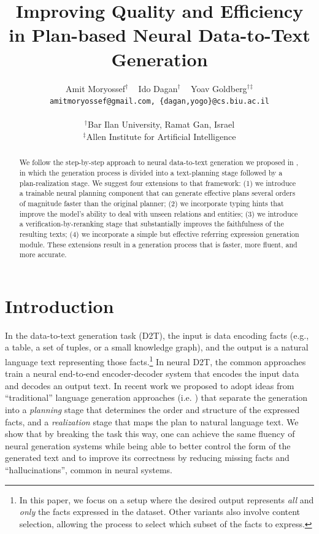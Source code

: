 \documentclass[11pt,a4paper,table,xcdraw]{article}
\title{Improving Quality and Efficiency \\in Plan-based Neural Data-to-Text Generation}
\author{Amit Moryossef$^\dagger \;\;\;$  Ido Dagan$^\dagger \;\;\;$ Yoav Goldberg$^\dagger$$^\ddagger$ \\
\texttt{amitmoryossef@gmail.com, \{dagan,yogo\}@cs.biu.ac.il} \\
\\ $^\dagger$Bar Ilan University, Ramat Gan, Israel \\
$^\ddagger$Allen Institute for Artificial Intelligence}
\date{}
\begin{document}
\maketitle
\begin{abstract}
We follow the step-by-step approach to neural data-to-text generation we proposed in \citet{step-by-step}, in which the generation process is divided into a text-planning stage followed by a plan-realization stage.
We suggest four extensions to that framework: (1) we introduce a trainable neural planning component that can generate effective plans several orders of magnitude faster than the original planner; (2) we incorporate typing hints that improve the model's ability to deal with unseen relations and entities; (3) we introduce a verification-by-reranking stage that substantially improves the faithfulness of the resulting texts; (4) we incorporate a simple but effective referring expression generation module. These extensions result in a generation process that is faster, more fluent, and more accurate. \end{abstract}

\thispagestyle{fancy}

\section{Introduction}
In the data-to-text generation task (D2T), the input is data encoding facts (e.g., a table, a set of tuples, or a small knowledge graph), and the output is a natural language text representing those facts.\footnote{In this paper, we focus on a setup where the desired output represents \emph{all} and \emph{only} the facts expressed in the dataset. Other variants also involve content selection, allowing the process to select which subset of the facts to express.} In neural D2T, the common approaches train a neural end-to-end encoder-decoder system that encodes the input data and decodes an output text. In recent work \cite{step-by-step} we proposed to adopt ideas from ``traditional'' language generation approaches (i.e. \citet{reiter2000building, walker2007individual, DBLP:journals/corr/GattK17}) that separate the generation into a \emph{planning} stage that determines the order and structure of the expressed facts, and a \emph{realization} stage that maps the plan to natural language text. We show that by breaking the task this way, one can achieve the same fluency of neural generation systems while being able to better control the form of the generated text and to improve its correctness by reducing missing facts and ``hallucinations'', common in neural systems.
\end{document}
